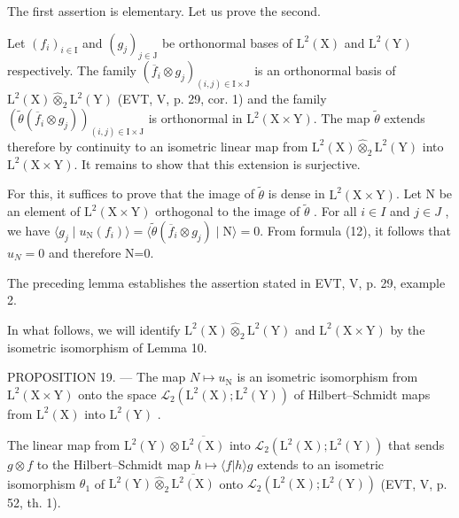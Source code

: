 The first assertion is elementary. Let us prove the second.

Let \((f_i)_{i\in \mathrm{I}}\) and \((g_j)_{j\in \mathrm{J}}\) be orthonormal bases of \(\mathrm{L}^2 (\mathrm{X})\) and \(\mathrm{L}^2 (\mathrm{Y})\) respectively. The family \((\overline{f}_i\otimes g_j)_{(i,j)\in \mathrm{I}\times \mathrm{J}}\) is an orthonormal basis of \(\mathrm{L}^2 (\mathrm{X})\widehat{\otimes}_2\mathrm{L}^2 (\mathrm{Y})\) (EVT, V, p. 29, cor. 1) and the family \((\widetilde{\theta} (\overline{f}_i\otimes g_j))_{(i,j)\in \mathrm{I}\times \mathrm{J}}\) is orthonormal in \(\mathrm{L}^2 (\mathrm{X}\times \mathrm{Y})\). The map \(\widetilde{\theta}\) extends therefore by continuity to an isometric linear map from \(\mathrm{L}^2 (\mathrm{X})\widehat{\otimes}_2\mathrm{L}^2 (\mathrm{Y})\) into \(\mathrm{L}^2 (\mathrm{X}\times \mathrm{Y})\). It remains to show that this extension is surjective.

For this, it suffices to prove that the image of \(\widetilde{\theta}\) is dense in \(\mathrm{L}^{2}(\mathrm{X}\times\mathrm{Y})\). Let N be an element of \(\mathrm{L}^{2}(\mathrm{X}\times\mathrm{Y})\) orthogonal to the image of \(\widetilde{\theta}\) . For all \(i\in I\) and \(j\in J\) , we have \(\langle g_{j}\mid u_{\mathrm{N}}(f_{i})\rangle=\langle\widetilde{\theta}(\overline{f}_{i}\otimes g_{j})\mid\mathrm{N}\rangle=0\). From formula (12), it follows that \(u_{N}=0\) and therefore N=0.

The preceding lemma establishes the assertion stated in EVT, V, p. 29, example 2.

In what follows, we will identify \(\mathrm{L}^{2}(\mathrm{X})\widehat{\otimes}_{2}\mathrm{L}^{2}(\mathrm{Y})\) and \(\mathrm{L}^{2}(\mathrm{X}\times\mathrm{Y})\) by the isometric isomorphism of Lemma 10.

PROPOSITION 19. --- The map \(N\mapsto u_{\mathrm{N}}\) is an isometric isomorphism from \(\mathrm{L}^{2}(\mathrm{X}\times\mathrm{Y})\) onto the space \(\mathcal{L}_{2}(\mathrm{L}^{2}(\mathrm{X});\mathrm{L}^{2}(\mathrm{Y}))\) of Hilbert--Schmidt maps from \(\mathrm{L}^{2}(\mathrm{X})\) into \(\mathrm{L}^{2}(\mathrm{Y})\) .

The linear map from \(\mathrm{L}^{2}(\mathrm{Y})\otimes\overline{\mathrm{L}^{2}(\mathrm{X})}\) into \(\mathcal{L}_{2}(\mathrm{L}^{2}(\mathrm{X});\mathrm{L}^{2}(\mathrm{Y}))\) that sends \(g\otimes f\) to the Hilbert--Schmidt map \(h\mapsto\langle f|h\rangle g\) extends to an isometric isomorphism \(\theta_{1}\) of \(\mathrm{L}^{2}(\mathrm{Y})\widehat{\otimes}_{2}\overline{\mathrm{L}^{2}(\mathrm{X})}\) onto \(\mathcal{L}_{2}(\mathrm{L}^{2}(\mathrm{X});\mathrm{L}^{2}(\mathrm{Y}))\) (EVT, V, p. 52, th. 1).

